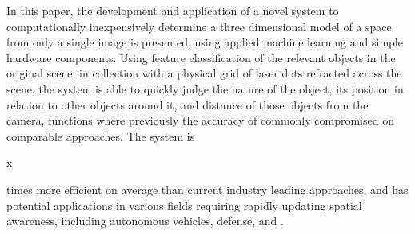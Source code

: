 In this paper, the development and application of a novel system to computationally inexpensively determine a three dimensional model of a space from only a single image is presented, using applied machine learning and simple hardware components. Using feature classification of the relevant objects in the original scene, in collection with a physical grid of laser dots refracted across the scene, the system is able to quickly judge the nature of the object, its position in relation to other objects around it, and distance of those objects from the camera, functions where previously the accuracy of  commonly compromised on comparable approaches. The system is \begin{it}x\end{it} times more efficient on average than current industry leading approaches, and has potential applications in various fields requiring rapidly updating spatial awareness, including autonomous vehicles, defense, and .